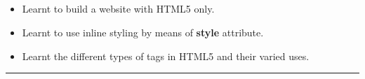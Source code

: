 \documentclass[12pt,letterpaper]{article}
\begin{document}
\subsection*{}
\renewcommand{\labelitemi}{$\textendash$}
\begin{itemize}
    \item Learnt to build a website with HTML5 only.
    \item Learnt to use inline styling by means of \textbf{style} attribute.
    \item Learnt the different types of tags in HTML5 and their varied uses.
\end{itemize}
\hrule
\end{document}
